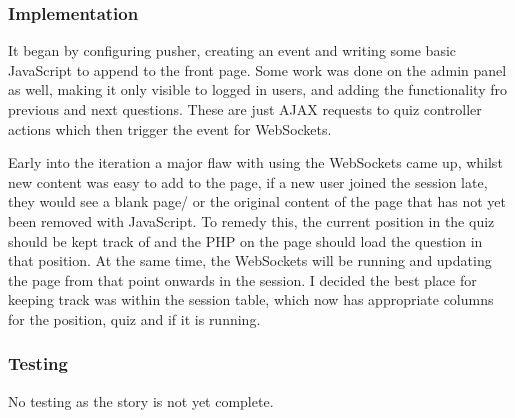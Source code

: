 \subsubsection{Implementation}
It began by configuring pusher, creating an event and writing some basic JavaScript to append to the front page. Some work was done on the admin panel as well, making it only visible to logged in users, and adding the functionality fro previous and next questions. These are just AJAX requests to quiz controller actions which then trigger the event for WebSockets.

Early into the iteration a major flaw with using the WebSockets came up, whilst new content was easy to add to the page, if a new user joined the session late, they would see a blank page/ or the original content of the page that has not yet been removed with JavaScript. To remedy this, the current position in the quiz should be kept track of and the PHP on the page should load the question in that position. At the same time, the WebSockets will be running and updating the page from that point onwards in the session. I decided the best place for keeping track was within the session table, which now has appropriate columns for the position, quiz and if it is running.
\subsubsection{Testing}
No testing as the story is not yet complete.
\newpage
